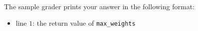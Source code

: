 The sample grader prints your answer in the following format:
\begin{itemize}
    \item line $1$: the return value of \texttt{max\_weights}
\end{itemize}
